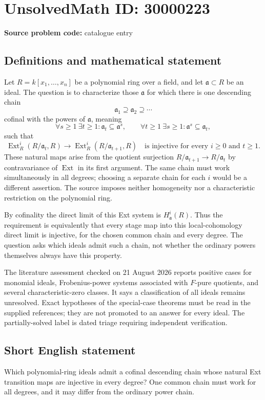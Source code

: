 \documentclass[11pt]{article}
\begin{document}
\section*{UnsolvedMath ID: 30000223}
\textbf{Source problem code:} catalogue entry
\subsection{Definitions and mathematical statement}
Let $R=k[x_1,\ldots,x_n]$ be a polynomial ring over a field, and let $\mathfrak a\subset R$ be an ideal. The question is to characterize those $\mathfrak a$ for which there is one descending chain
\[
 \mathfrak a_1\supseteq\mathfrak a_2\supseteq\cdots
\]
cofinal with the powers of $\mathfrak a$, meaning
\[
 \forall s\ge1\ \exists t\ge1:\mathfrak a_t\subseteq\mathfrak a^s,
 \qquad
 \forall t\ge1\ \exists s\ge1:\mathfrak a^s\subseteq\mathfrak a_t,
\]
such that
\[
 \operatorname{Ext}^i_R(R/\mathfrak a_t,R)
 \longrightarrow\operatorname{Ext}^i_R(R/\mathfrak a_{t+1},R)
 \quad\text{is injective for every }i\ge0\text{ and }t\ge1.
\]
These natural maps arise from the quotient surjection $R/\mathfrak a_{t+1}\to R/\mathfrak a_t$ by contravariance of $\operatorname{Ext}$ in its first argument. The same chain must work simultaneously in all degrees; choosing a separate chain for each $i$ would be a different assertion. The source imposes neither homogeneity nor a characteristic restriction on the polynomial ring.

By cofinality the direct limit of this Ext system is $H^i_{\mathfrak a}(R)$. Thus the requirement is equivalently that every stage map into this local-cohomology direct limit is injective, for the chosen common chain and every degree. The question asks which ideals admit such a chain, not whether the ordinary powers themselves always have this property.

The literature assessment checked on 21 August 2026 reports positive cases for monomial ideals, Frobenius-power systems associated with $F$-pure quotients, and several characteristic-zero classes. It says a classification of all ideals remains unresolved. Exact hypotheses of the special-case theorems must be read in the supplied references; they are not promoted to an answer for every ideal. The partially-solved label is dated triage requiring independent verification.
\subsection{Short English statement}
Which polynomial-ring ideals admit a cofinal descending chain whose natural Ext transition maps are injective in every degree? One common chain must work for all degrees, and it may differ from the ordinary power chain.
\end{document}
